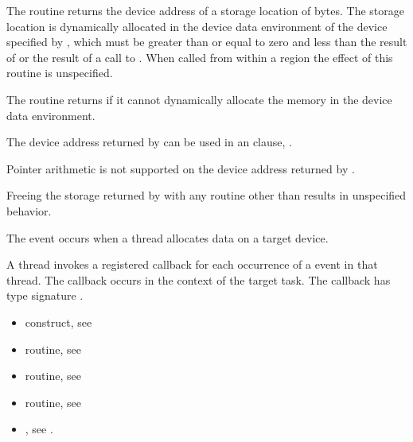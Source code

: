\effect

The  routine returns the device address of a storage
location of  bytes. The storage location is dynamically allocated in
the device data environment of the device specified by , which
must be greater than or equal to zero and less than the result of
 or the result of a call to
. When called from within a  region 
the effect of this routine is unspecified.

The  routine returns  if it cannot dynamically
allocate the memory in the device data environment. 

The device address returned by  can be used in an 
 clause, .

Pointer arithmetic is not supported on the device address returned by
.

Freeing the storage returned by  with any routine
other than  results in unspecified behavior.

\pagebreak
{}
\events
The  event occurs when a thread allocates data on a target device.

\tools

A thread invokes a registered 
callback for each occurrence of a  event in that thread. 
The callback occurs in the context of the target task.  The callback has type signature
. 


\crossreferences
\begin{itemize}
\item {} construct, see 

\item {} routine, see 

\item {} routine, see 

\item {} routine, see 

\item {}, see 
.

\end{itemize}



